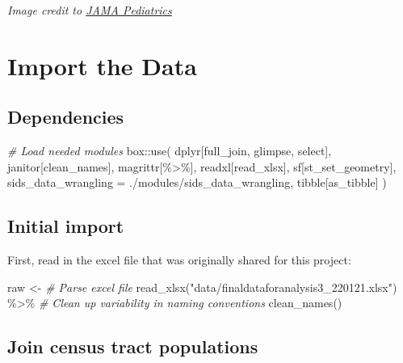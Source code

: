 \documentclass[
]{book}
\newenvironment{Shaded}{\begin{snugshade}}{\end{snugshade}}
\newcommand{\AttributeTok}[1]{\textcolor[rgb]{0.77,0.63,0.00}{#1}}
\newcommand{\CommentTok}[1]{\textcolor[rgb]{0.56,0.35,0.01}{\textit{#1}}}
\newcommand{\FunctionTok}[1]{\textcolor[rgb]{0.00,0.00,0.00}{#1}}
\newcommand{\NormalTok}[1]{#1}
\newcommand{\OtherTok}[1]{\textcolor[rgb]{0.56,0.35,0.01}{#1}}
\newcommand{\SpecialCharTok}[1]{\textcolor[rgb]{0.00,0.00,0.00}{#1}}
\newcommand{\StringTok}[1]{\textcolor[rgb]{0.31,0.60,0.02}{#1}}
\begin{document}
\emph{Image credit to \href{https://jamanetwork.com/journals/jamapediatrics/fullarticle/2599897}{JAMA Pediatrics}}

\hypertarget{import-the-data}{%
\chapter{Import the Data}\label{import-the-data}}

\hypertarget{dependencies}{%
\section{Dependencies}\label{dependencies}}

\begin{Shaded}
\begin{Highlighting}[]
\CommentTok{\# Load needed modules}
\NormalTok{box}\SpecialCharTok{::}\FunctionTok{use}\NormalTok{(}
\NormalTok{    dplyr[full\_join, glimpse, select],}
\NormalTok{    janitor[clean\_names],}
\NormalTok{    magrittr[}\StringTok{\textasciigrave{}}\AttributeTok{\%\textgreater{}\%}\StringTok{\textasciigrave{}}\NormalTok{],}
\NormalTok{    readxl[read\_xlsx],}
\NormalTok{    sf[st\_set\_geometry],}
    \AttributeTok{sids\_data\_wrangling =}\NormalTok{ .}\SpecialCharTok{/}\NormalTok{modules}\SpecialCharTok{/}\NormalTok{sids\_data\_wrangling,}
\NormalTok{    tibble[as\_tibble]}
\NormalTok{)}
\end{Highlighting}
\end{Shaded}

\hypertarget{initial-import}{%
\section{Initial import}\label{initial-import}}

First, read in the excel file that was originally shared for this project:

\begin{Shaded}
\begin{Highlighting}[]
\NormalTok{raw }\OtherTok{\textless{}{-}} 
    \CommentTok{\# Parse excel file}
    \FunctionTok{read\_xlsx}\NormalTok{(}\StringTok{"data/finaldataforanalysis3\_220121.xlsx"}\NormalTok{) }\SpecialCharTok{\%\textgreater{}\%}
    \CommentTok{\# Clean up variability in naming conventions}
    \FunctionTok{clean\_names}\NormalTok{()}
\end{Highlighting}
\end{Shaded}

\hypertarget{join-census-tract-populations}{%
\section{Join census tract populations}\label{join-census-tract-populations}}
\end{document}
